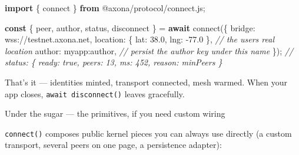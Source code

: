 \documentclass[
  nobib]{tufte-handout}
\newenvironment{Shaded}{}{}
\newcommand{\CommentTok}[1]{\textcolor[rgb]{0.38,0.63,0.69}{\textit{#1}}}
\newcommand{\ControlFlowTok}[1]{\textcolor[rgb]{0.00,0.44,0.13}{\textbf{#1}}}
\newcommand{\DataTypeTok}[1]{\textcolor[rgb]{0.56,0.13,0.00}{#1}}
\newcommand{\FloatTok}[1]{\textcolor[rgb]{0.25,0.63,0.44}{#1}}
\newcommand{\FunctionTok}[1]{\textcolor[rgb]{0.02,0.16,0.49}{#1}}
\newcommand{\ImportTok}[1]{\textcolor[rgb]{0.00,0.50,0.00}{\textbf{#1}}}
\newcommand{\KeywordTok}[1]{\textcolor[rgb]{0.00,0.44,0.13}{\textbf{#1}}}
\newcommand{\NormalTok}[1]{#1}
\newcommand{\OperatorTok}[1]{\textcolor[rgb]{0.40,0.40,0.40}{#1}}
\newcommand{\StringTok}[1]{\textcolor[rgb]{0.25,0.44,0.63}{#1}}
\begin{document}
\begin{Shaded}
\begin{Highlighting}[]
\ImportTok{import}\NormalTok{ \{ connect \} }\ImportTok{from} \StringTok{\textquotesingle{}@axona/protocol/connect.js\textquotesingle{}}\OperatorTok{;}

\KeywordTok{const}\NormalTok{ \{ peer}\OperatorTok{,}\NormalTok{ author}\OperatorTok{,}\NormalTok{ status}\OperatorTok{,}\NormalTok{ disconnect \} }\OperatorTok{=} \ControlFlowTok{await} \FunctionTok{connect}\NormalTok{(\{}
  \DataTypeTok{bridge}\OperatorTok{:}   \StringTok{\textquotesingle{}wss://testnet.axona.net\textquotesingle{}}\OperatorTok{,}
  \DataTypeTok{location}\OperatorTok{:}\NormalTok{ \{ }\DataTypeTok{lat}\OperatorTok{:} \FloatTok{38.0}\OperatorTok{,} \DataTypeTok{lng}\OperatorTok{:} \OperatorTok{{-}}\FloatTok{77.0}\NormalTok{ \}}\OperatorTok{,}   \CommentTok{// the user\textquotesingle{}s real location}
  \DataTypeTok{author}\OperatorTok{:}   \StringTok{\textquotesingle{}myapp:author\textquotesingle{}}\OperatorTok{,}             \CommentTok{// persist the author key under this name}
\NormalTok{\})}\OperatorTok{;}
\CommentTok{// status: \{ ready: true, peers: 13, ms: 452, reason: \textquotesingle{}minPeers\textquotesingle{} \}}
\end{Highlighting}
\end{Shaded}

That's it --- identities minted, transport connected, mesh warmed. When
your app closes, \texttt{await\ disconnect()} leaves gracefully.

Under the sugar --- the primitives, if you need custom wiring

\texttt{connect()} composes public kernel pieces you can always use
directly (a custom transport, several peers on one page, a persistence
adapter):
\end{document}
